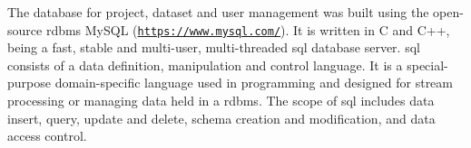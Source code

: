 The database for project, dataset and user management was built using the open-source \gls{rdbms} MySQL (\href{https://www.mysql.com/}{\nolinkurl{https://www.mysql.com/}}). It is written in C and C++, being a fast, stable and multi-user, multi-threaded \gls{sql} database server. \gls{sql} consists of a data definition, manipulation and control language. It is a special-purpose domain-specific language used in programming and designed for stream processing or managing data held in a \gls{rdbms}. The scope of \gls{sql} includes data insert, query, update and delete, schema creation and modification, and data access control. 




